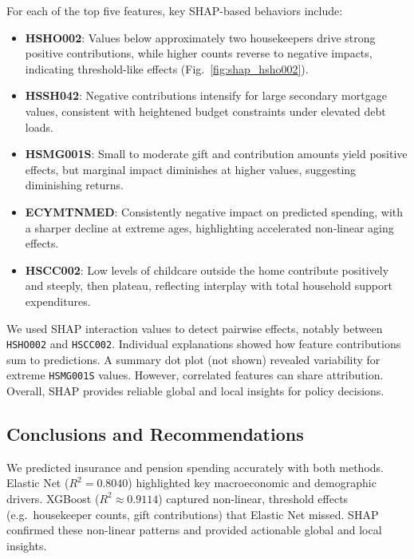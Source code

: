 \documentclass{article}
\begin{document}
For each of the top five features, key SHAP-based behaviors include:
\begin{itemize}
  \item \textbf{HSHO002}: Values below approximately two housekeepers drive strong positive contributions, while higher counts reverse to negative impacts, indicating threshold-like effects (Fig.~\ref{fig:shap_hsho002}).
  \item \textbf{HSSH042}: Negative contributions intensify for large secondary mortgage values, consistent with heightened budget constraints under elevated debt loads.
  \item \textbf{HSMG001S}: Small to moderate gift and contribution amounts yield positive effects, but marginal impact diminishes at higher values, suggesting diminishing returns.
  \item \textbf{ECYMTNMED}: Consistently negative impact on predicted spending, with a sharper decline at extreme ages, highlighting accelerated non‑linear aging effects.
  \item \textbf{HSCC002}: Low levels of childcare outside the home contribute positively and steeply, then plateau, reflecting interplay with total household support expenditures.
\end{itemize}

We used SHAP interaction values to detect pairwise effects, notably between \texttt{HSHO002} and \texttt{HSCC002}. Individual explanations showed how feature contributions sum to predictions. A summary dot plot (not shown) revealed variability for extreme \texttt{HSMG001S} values. However, correlated features can share attribution. Overall, SHAP provides reliable global and local insights for policy decisions.

\subsection*{Conclusions and Recommendations}

We predicted insurance and pension spending accurately with both methods. Elastic Net ($R^2=0.8040$) highlighted key macroeconomic and demographic drivers. XGBoost ($R^2\approx0.9114$) captured non-linear, threshold effects (e.g.\ housekeeper counts, gift contributions) that Elastic Net missed. SHAP confirmed these non-linear patterns and provided actionable global and local insights.
\end{document}
